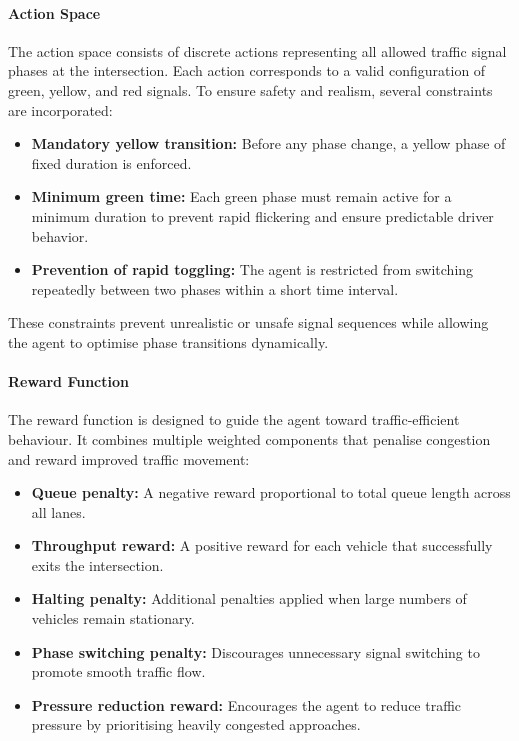 ﻿\documentclass[11pt, a4paper]{report}
\begin{document}
\paragraph{Action Space}

The action space consists of discrete actions representing all allowed traffic signal phases at the intersection. Each action corresponds to a valid configuration of green, yellow, and red signals. To ensure safety and realism, several constraints are incorporated:

\begin{itemize}
    \item \textbf{Mandatory yellow transition:} Before any phase change, a yellow phase of fixed duration is enforced.
    \item \textbf{Minimum green time:} Each green phase must remain active for a minimum duration to prevent rapid flickering and ensure predictable driver behavior.
    \item \textbf{Prevention of rapid toggling:} The agent is restricted from switching repeatedly between two phases within a short time interval.
\end{itemize}

These constraints prevent unrealistic or unsafe signal sequences while allowing the agent to optimise phase transitions dynamically.

\paragraph{Reward Function}

The reward function is designed to guide the agent toward traffic-efficient behaviour. It combines multiple weighted components that penalise congestion and reward improved traffic movement:

\begin{itemize}
    \item \textbf{Queue penalty:} A negative reward proportional to total queue length across all lanes.
    \item \textbf{Throughput reward:} A positive reward for each vehicle that successfully exits the intersection.
    \item \textbf{Halting penalty:} Additional penalties applied when large numbers of vehicles remain stationary.
    \item \textbf{Phase switching penalty:} Discourages unnecessary signal switching to promote smooth traffic flow.
    \item \textbf{Pressure reduction reward:} Encourages the agent to reduce traffic pressure by prioritising heavily congested approaches.
\end{itemize}
\end{document}
